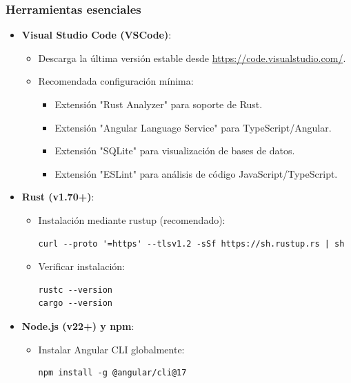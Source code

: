 \documentclass[11pt, a4paper]{article}
\begin{document}
    \subsubsection{Herramientas esenciales}

    \begin{itemize}
      \item \textbf{Visual Studio Code (VSCode)}:
      \begin{itemize}
        \item Descarga la última versión estable desde \url{https://code.visualstudio.com/}.
        \item Recomendada configuración mínima:
        \begin{itemize}
          \item Extensión "Rust Analyzer" para soporte de Rust.
          \item Extensión "Angular Language Service" para TypeScript/Angular.
          \item Extensión "SQLite" para visualización de bases de datos.
          \item Extensión "ESLint" para análisis de código JavaScript/TypeScript.
          \end{itemize}
        \end{itemize}
        
        \item \textbf{Rust (v1.70+)}:
          \begin{itemize}
            \item Instalación mediante rustup (recomendado):
              \begin{lstlisting}[caption={Instala Rust}]
curl --proto '=https' --tlsv1.2 -sSf https://sh.rustup.rs | sh
              \end{lstlisting}
            \item Verificar instalación:
              \begin{lstlisting}
rustc --version
cargo --version
              \end{lstlisting}
        \end{itemize}
        
        \item \textbf{Node.js (v22+) y npm}:
        \begin{itemize}
          \item Instalar Angular CLI globalmente:
          \begin{lstlisting}[caption={Instalar Angular}]
npm install -g @angular/cli@17
          \end{lstlisting}
        \end{itemize}
    \end{itemize}
\end{document}
